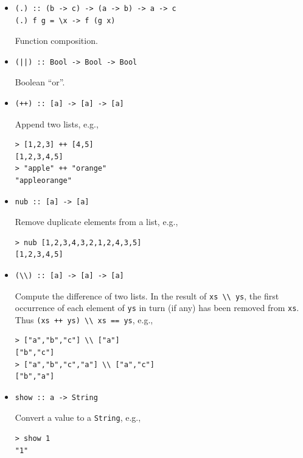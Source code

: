 \documentclass[addpoints]{exam}
\begin{document}
\begin{itemize}
\item
\begin{verbatim}
(.) :: (b -> c) -> (a -> b) -> a -> c
(.) f g = \x -> f (g x)
\end{verbatim}
Function composition.
\item
\begin{verbatim}
(||) :: Bool -> Bool -> Bool
\end{verbatim}
Boolean ``or''.
\item
\begin{verbatim}
(++) :: [a] -> [a] -> [a]
\end{verbatim}
Append two lists, e.g.,
\begin{verbatim}
> [1,2,3] ++ [4,5]
[1,2,3,4,5]
> "apple" ++ "orange"
"appleorange"
\end{verbatim}
\item 
\begin{verbatim}
nub :: [a] -> [a]
\end{verbatim}
Remove duplicate elements from a list, e.g.,
\begin{verbatim}
> nub [1,2,3,4,3,2,1,2,4,3,5]
[1,2,3,4,5]
\end{verbatim}
\item
\begin{verbatim}
(\\) :: [a] -> [a] -> [a]
\end{verbatim}
Compute the difference of two lists. In the result of \verb|xs \\ ys|, the first occurrence of each element of \texttt{ys} in turn (if any) has been removed from \texttt{xs}.  Thus \verb|(xs ++ ys) \\ xs == ys|, e.g.,
\begin{verbatim}
> ["a","b","c"] \\ ["a"]
["b","c"]
> ["a","b","c","a"] \\ ["a","c"]
["b","a"]
\end{verbatim}
\item
\begin{verbatim}
show :: a -> String
\end{verbatim}
Convert a value to a \texttt{String}, e.g.,
\begin{verbatim}
> show 1
"1"
\end{verbatim}
\end{itemize}
\end{document}
